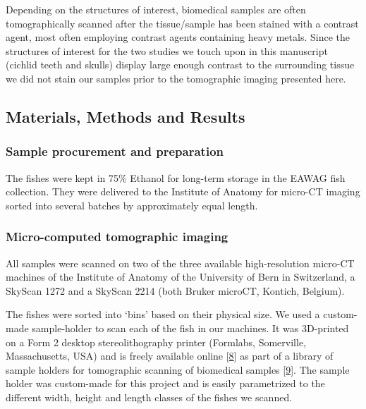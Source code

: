Depending on the structures of interest, biomedical samples are often tomographically scanned after the tissue/sample has been stained with a contrast agent, most often employing contrast agents containing heavy metals.
Since the structures of interest for the two studies we touch upon in this manuscript (cichlid teeth and skulls) display large enough contrast to the surrounding tissue we did not stain our samples prior to the tomographic imaging presented here.

\hypertarget{materials-methods-and-results}{%
\subsection{Materials, Methods and Results}\label{materials-methods-and-results}}

\hypertarget{sample-procurement-and-preparation}{%
\subsubsection{Sample procurement and preparation}\label{sample-procurement-and-preparation}}

The fishes were kept in 75\% Ethanol for long-term storage in the EAWAG fish collection.
They were delivered to the Institute of Anatomy for micro-CT imaging sorted into several batches by approximately equal length.

\hypertarget{micro-computed-tomographic-imaging}{%
\subsubsection{Micro-computed tomographic imaging}\label{micro-computed-tomographic-imaging}}

All samples were scanned on two of the three available high-resolution micro-CT machines of the Institute of Anatomy of the University of Bern in Switzerland, a SkyScan 1272 and a SkyScan 2214 (both Bruker microCT, Kontich, Belgium).

The fishes were sorted into `bins' based on their physical size.
We used a custom-made sample-holder to scan each of the fish in our machines.
It was 3D-printed on a Form 2 desktop stereolithography printer (Formlabs, Somerville, Massachusetts, USA) and is freely available online {[}\protect\hyperlink{ref-VCZPOv2f}{8}{]} as part of a library of sample holders for tomographic scanning of biomedical samples {[}\protect\hyperlink{ref-115PPSuQp}{9}{]}.
The sample holder was custom-made for this project and is easily parametrized to the different width, height and length classes of the fishes we scanned.

